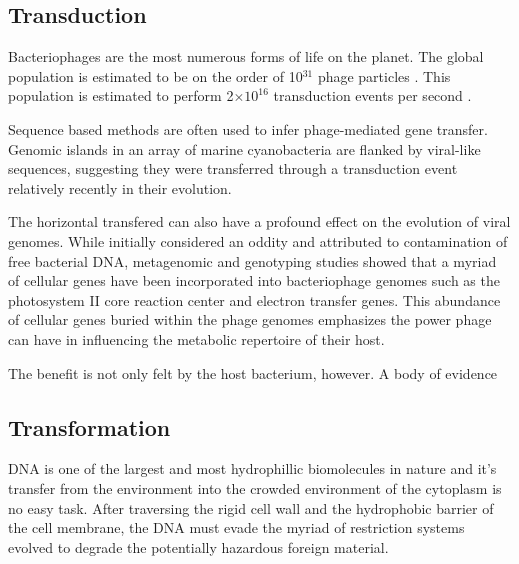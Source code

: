 \subsection*{Transduction}
Bacteriophages are the most numerous forms of life on the planet. The global
population is estimated to be on the order of 10$^{31}$ phage
particles \cite{Comeau:2008jo}. This population is estimated to perform 2$\times
10^{16}$ transduction events per second \cite{ChibaniChennoufi:2004gv}.


Sequence based methods are often used to infer phage-mediated gene transfer.
Genomic islands in an array of marine cyanobacteria are flanked by viral-like
sequences, suggesting they were transferred through a transduction event
relatively recently in their evolution\cite{Anonymous:2004vg, Palenik:2003ef}.

The horizontal transfered can also have a profound effect on the evolution of
viral genomes. While initially considered an oddity and attributed to
contamination of free bacterial DNA, metagenomic and genotyping studies showed
that a myriad of cellular genes have been incorporated into bacteriophage
genomes such as the photosystem II core reaction center and electron transfer
genes\cite{Anonymous:2004vg,Comeau:2008jo}.  This abundance of cellular genes
buried within the phage genomes emphasizes the power phage can have in
influencing the metabolic repertoire of their host. 

The benefit is not only felt by the host bacterium, however. A body of evidence 
\subsection*{Transformation}
DNA is one of the largest and most hydrophillic biomolecules in nature and it's
transfer from the environment into the crowded environment of the cytoplasm is
no easy task. After traversing the rigid cell wall and the hydrophobic barrier
of the cell membrane, the DNA must evade the myriad of restriction systems
evolved to degrade the potentially hazardous foreign material. 


